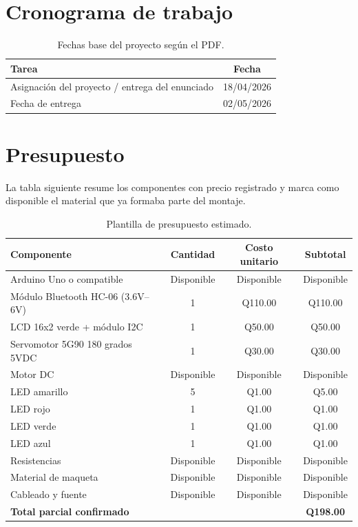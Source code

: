 \documentclass[12pt,a4paper]{article}
\begin{document}
\section{Cronograma de trabajo}
\begin{table}[H]
    \centering
    \caption{Fechas base del proyecto según el PDF.}
    \begin{tabular}{p{9cm}c}
        \toprule
        \textbf{Tarea} & \textbf{Fecha} \\
        \midrule
        Asignación del proyecto / entrega del enunciado & 18/04/2026 \\
        Fecha de entrega & 02/05/2026 \\
        \bottomrule
    \end{tabular}
\end{table}

\section{Presupuesto}
La tabla siguiente resume los componentes con precio registrado y marca como disponible el material que ya formaba parte del montaje.

\begin{table}[H]
    \centering
    \caption{Plantilla de presupuesto estimado.}
    \begin{tabular}{p{5cm}c c c}
        \toprule
        \textbf{Componente} & \textbf{Cantidad} & \textbf{Costo unitario} & \textbf{Subtotal} \\
        \midrule
        Arduino Uno o compatible & Disponible & Disponible & Disponible \\
        Módulo Bluetooth HC-06 (3.6V--6V) & 1 & Q110.00 & Q110.00 \\
        LCD 16x2 verde + módulo I2C & 1 & Q50.00 & Q50.00 \\
        Servomotor 5G90 180 grados 5VDC & 1 & Q30.00 & Q30.00 \\
        Motor DC & Disponible & Disponible & Disponible \\
        LED amarillo & 5 & Q1.00 & Q5.00 \\
        LED rojo & 1 & Q1.00 & Q1.00 \\
        LED verde & 1 & Q1.00 & Q1.00 \\
        LED azul & 1 & Q1.00 & Q1.00 \\
        Resistencias & Disponible & Disponible & Disponible \\
        Material de maqueta & Disponible & Disponible & Disponible \\
        Cableado y fuente & Disponible & Disponible & Disponible \\
        \midrule
        \textbf{Total parcial confirmado} &  &  & \textbf{Q198.00} \\
        \bottomrule
    \end{tabular}
\end{table}
\end{document}
